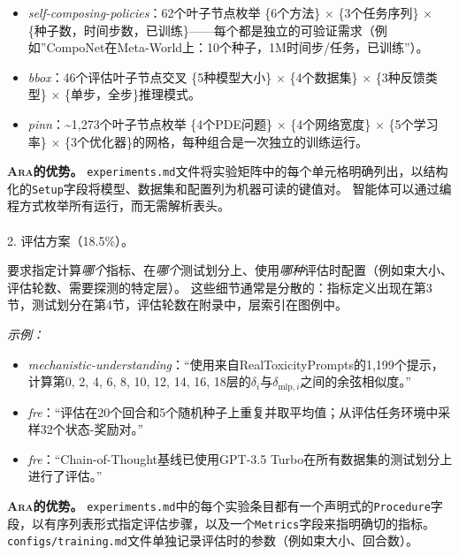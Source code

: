 \documentclass[
]{article}
\makeatletter
\let\oldparagraph\paragraph
\renewcommand{\paragraph}{
    \@ifstar
      \xxxParagraphStar
      \xxxParagraphNoStar
  }
\newcommand{\xxxParagraphStar}[1]{\oldparagraph*{#1}\mbox{}}
\newcommand{\xxxParagraphNoStar}[1]{\oldparagraph{#1}\mbox{}}
\newcommand{\passthrough}[1]{#1}
\providecommand{\tightlist}{%
  \setlength{\itemsep}{0pt}\setlength{\parskip}{0pt}}
\theoremstyle{definition}
\newcommand{\ara}{\textsc{Ara}}
\makeatother
\begin{document}
\begin{itemize}
\tightlist
\item
  \emph{self-composing-policies}：62个叶子节点枚举 \{6个方法\}
  \(\times\) \{3个任务序列\} \(\times\)
  \{种子数，时间步数，已训练\}------每个都是独立的可验证需求（例如''CompoNet在Meta-World上：10个种子，1M时间步/任务，已训练''）。
\item
  \emph{bbox}：46个评估叶子节点交叉 \{5种模型大小\} \(\times\)
  \{4个数据集\} \(\times\) \{3种反馈类型\} \(\times\)
  \{单步，全步\}推理模式。
\item
  \emph{pinn}：\textasciitilde1,273个叶子节点枚举 \{4个PDE问题\}
  \(\times\) \{4个网络宽度\} \(\times\) \{5个学习率\} \(\times\)
  \{3个优化器\}的网格，每种组合是一次独立的训练运行。
\end{itemize}

\textbf{\ara{}的优势。}
\passthrough{\lstinline!experiments.md!}文件将实验矩阵中的每个单元格明确列出，以结构化的\passthrough{\lstinline!Setup!}字段将模型、数据集和配置列为机器可读的键值对。
智能体可以通过编程方式枚举所有运行，而无需解析表头。

\paragraph{2. 评估方案（18.5\%）。}\label{ux8bc4ux4f30ux65b9ux684818.5}

要求指定计算\emph{哪个}指标、在\emph{哪个}测试划分上、使用\emph{哪种}评估时配置（例如束大小、评估轮数、需要探测的特定层）。
这些细节通常是分散的：指标定义出现在第3节，测试划分在第4节，评估轮数在附录中，层索引在图例中。

\emph{示例：}

\begin{itemize}
\tightlist
\item
  \emph{mechanistic-understanding}：``使用来自RealToxicityPrompts的1,199个提示，计算第0,
  2, 4, 6, 8, 10, 12, 14, 16,
  18层的\(\delta_i\)与\(\delta_{\text{mlp},i}\)之间的余弦相似度。''
\item
  \emph{fre}：``评估在20个回合和5个随机种子上重复并取平均值；从评估任务环境中采样32个状态-奖励对。''
\item
  \emph{fre}：``Chain-of-Thought基线已使用GPT-3.5
  Turbo在所有数据集的测试划分上进行了评估。''
\end{itemize}

\textbf{\ara{}的优势。}
\passthrough{\lstinline!experiments.md!}中的每个实验条目都有一个声明式的\passthrough{\lstinline!Procedure!}字段，以有序列表形式指定评估步骤，以及一个\passthrough{\lstinline!Metrics!}字段来指明确切的指标。
\passthrough{\lstinline!configs/training.md!}文件单独记录评估时的参数（例如束大小、回合数）。
\end{document}
